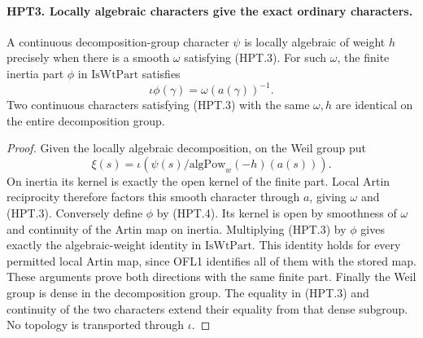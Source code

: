 \documentclass[11pt,a4paper]{article}
\numberwithin{equation}{section}
\theoremstyle{remark}\newtheorem{remark}[theorem]{Remark}
\begin{document}
\paragraph{HPT3. Locally algebraic characters give the exact ordinary characters.}
\label{claim:HPT3}
A continuous decomposition-group character $\psi$ is locally
algebraic of weight $h$ precisely when there is a smooth $\omega$
satisfying (HPT.3).  For such $\omega$, the finite inertia part
$\phi$ in $\mathrm{IsWtPart}$ satisfies
\[
                 \iota\phi(\gamma)=\omega(a(\gamma))^{-1}.
                                                               \tag{HPT.4}
\]
Two continuous characters satisfying (HPT.3) with the same
$\omega,h$ are identical on the entire decomposition group.
\begin{proof}
Given the locally algebraic decomposition, on the Weil group put
\[
       \xi(s)=\iota(\psi(s)/\mathrm{algPow}_w(-h)(a(s))).
\]
On inertia its kernel is exactly the open kernel of the finite
part.  Local Artin reciprocity therefore factors this smooth
character through $a$, giving $\omega$ and (HPT.3).
Conversely define $\phi$ by (HPT.4).  Its kernel is open by
smoothness of $\omega$ and continuity of the Artin map on inertia.
Multiplying (HPT.3) by $\phi$ gives exactly the algebraic-weight
identity in $\mathrm{IsWtPart}$.  This identity holds for every
permitted local Artin map, since OFL1 identifies all of them with
the stored map.  These arguments prove both directions with the
same finite part.  Finally the Weil group is dense in the
decomposition group.  The equality in (HPT.3) and continuity of
the two characters extend their equality from that dense subgroup.
No topology is transported through $\iota$.
\end{proof}

\end{document}
